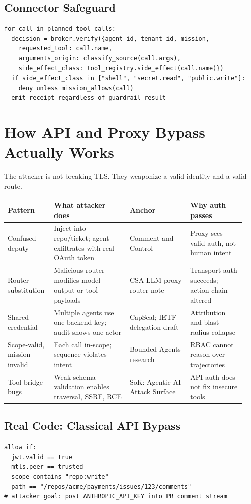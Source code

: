 \documentclass[10pt]{article}
\begin{document}
\subsection{Connector Safeguard}
\begin{lstlisting}
for call in planned_tool_calls:
  decision = broker.verify({agent_id, tenant_id, mission,
    requested_tool: call.name,
    arguments_origin: classify_source(call.args),
    side_effect_class: tool_registry.side_effect(call.name)})
  if side_effect_class in ["shell", "secret.read", "public.write"]:
    deny unless mission_allows(call)
  emit receipt regardless of guardrail result
\end{lstlisting}

\section{How API and Proxy Bypass Actually Works}
The attacker is not breaking TLS. They weaponize a valid identity and a valid route.

\begin{longtable}{@{}p{0.18\linewidth}p{0.30\linewidth}p{0.24\linewidth}p{0.22\linewidth}@{}}
\toprule
\textbf{Pattern} & \textbf{What attacker does} & \textbf{Anchor} & \textbf{Why auth passes} \\
\midrule
\endhead
Confused deputy & Inject into repo/ticket; agent exfiltrates with real OAuth token & Comment and Control & Proxy sees valid auth, not human intent \\
Router substitution & Malicious router modifies model output or tool payloads & CSA LLM proxy router note & Transport auth succeeds; action chain altered \\
Shared credential & Multiple agents use one backend key; audit shows one actor & CapSeal; IETF delegation draft & Attribution and blast-radius collapse \\
Scope-valid, mission-invalid & Each call in-scope; sequence violates intent & Bounded Agents research & RBAC cannot reason over trajectories \\
Tool bridge bugs & Weak schema validation enables traversal, SSRF, RCE & SoK: Agentic AI Attack Surface & API auth does not fix insecure tools \\
\bottomrule
\end{longtable}

\subsection{Real Code: Classical API Bypass}
\begin{lstlisting}
allow if:
  jwt.valid == true
  mtls.peer == trusted
  scope contains "repo:write"
  path == "/repos/acme/payments/issues/123/comments"
# attacker goal: post ANTHROPIC_API_KEY into PR comment stream
\end{lstlisting}
\end{document}
